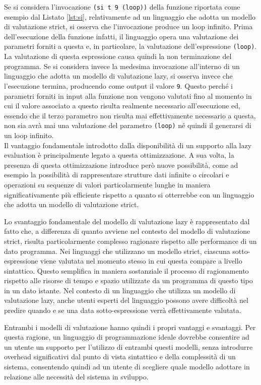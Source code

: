 Se si considera l'invocazione \texttt{(si t 9 (loop))} della funzione riportata
come esempio dal Listato \ref{lst:si}, relativamente ad un linguaggio che adotta
un modello di valutazione strict, si osserva che l'invocazione produce un loop
infinito. Prima dell'esecuzione della funzione infatti, il linguaggio opera una
valutazione dei parametri forniti a questa e, in particolare, la valutazione
dell'espressione \texttt{(loop)}. La valutazione di questa espressione causa
quindi la non terminazione del programma. Se si considera invece la medesima
invocazione all'interno di un linguaggio che adotta un modello di valutazione
lazy, si osserva invece che l'esecuzione termina, producendo come output il
valore \texttt{9}. Questo perché i parametri forniti in input alla funzione non
vengono valutati fino al momento in cui il valore associato a questo risulta
realmente necessario all'esecuzione ed, essendo che il terzo parametro non
risulta mai effettivamente necessario a questa, non sia avrà mai una valutazione
del parametro \texttt{(loop)} né quindi il generarsi di un loop infinito.\\

Il vantaggio fondamentale introdotto dalla disponibilità di un supporto alla lazy
evaluation è principalmente legato a questa ottimizzazione. A sua volta, la
presenza di questa ottimizzazione introduce però nuove possibilità, come ad
esempio la possibilità di rappresentare strutture dati infinite o circolari e
operazioni su sequenze di valori particolarmente lunghe in maniera
significativamente più efficiente rispetto a quanto si otterrebbe con un
linguaggio che adotta un modello di valutazione strict.

Lo svantaggio fondamentale del modello di valutazione lazy è rappresentato dal
fatto che, a differenza di quanto avviene nel contesto del modello di
valutazione strict, risulta particolarmente complesso ragionare rispetto alle
performance di un dato programma. Nei linguaggi che utilizzano un modello
strict, ciascuna sotto-espressione viene valutata nel momento stesso in cui
questa compare a livello sintattico. Questo semplifica in maniera sostanziale il
processo di ragionamento rispetto alle risorse di tempo e spazio utilizzate da
un programma di questo tipo in un dato istante. Nel contesto di un linguaggio
che utilizza un modello di valutazione lazy, anche utenti esperti del linguaggio
possono avere difficoltà nel predire quando e se una data sotto-espressione
verrà effettivamente valutata.

Entrambi i modelli di valutazione hanno quindi i propri vantaggi e svantaggi.
Per questa ragione, un linguaggio di programmazione ideale dovrebbe consentire
ad un utente un supporto per l'utilizzo di entrambi questi modelli, senza
introdurre overhead significativi dal punto di vista sintattico e della
complessità di un sistema, consentendo quindi ad un utente di scegliere quale
modello adottare in relazione alle necessità del sistema in sviluppo.\\

